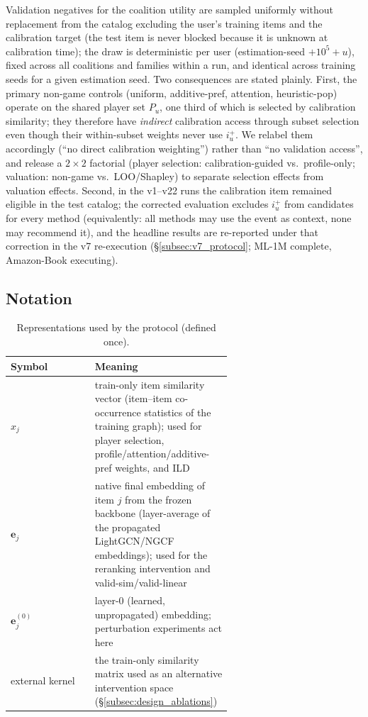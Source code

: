 \documentclass[pdflatex,sn-mathphys-num]{sn-jnl}
\begin{document}
Validation negatives for the coalition utility are sampled uniformly without replacement from the catalog excluding the user's training items and the calibration target (the test item is never blocked because it is unknown at calibration time); the draw is deterministic per user (estimation-seed $+10^{5}+u$), fixed across all coalitions and families within a run, and identical across training seeds for a given estimation seed. Two consequences are stated plainly. First, the primary non-game controls (uniform, additive-pref, attention, heuristic-pop) operate on the shared player set $P_u$, one third of which is selected by calibration similarity; they therefore have \emph{indirect} calibration access through subset selection even though their within-subset weights never use $i_u^+$. We relabel them accordingly (``no direct calibration weighting'') rather than ``no validation access'', and release a $2\times2$ factorial (player selection: calibration-guided vs.\ profile-only; valuation: non-game vs.\ LOO/Shapley) to separate selection effects from valuation effects. Second, in the v1--v22 runs the calibration item remained eligible in the test catalog; the corrected evaluation excludes $i_u^+$ from candidates for every method (equivalently: all methods may use the event as context, none may recommend it), and the headline results are re-reported under that correction in the v7 re-execution (\S\ref{subsec:v7_protocol}; ML-1M complete, Amazon-Book executing).

\subsection{Notation}\label{subsec:notation}

\begin{table}[t]
\caption{Representations used by the protocol (defined once).}\label{tab:notation}
\centering
\small
\begin{tabular}{lp{0.62\linewidth}}
\toprule
Symbol & Meaning \\
\midrule
$x_j$ & train-only item similarity vector (item--item co-occurrence statistics of the training graph); used for player selection, profile/attention/additive-pref weights, and ILD \\
$\mathbf{e}_j$ & native final embedding of item $j$ from the frozen backbone (layer-average of the propagated LightGCN/NGCF embeddings); used for the reranking intervention and valid-sim/valid-linear \\
$\mathbf{e}^{(0)}_j$ & layer-0 (learned, unpropagated) embedding; perturbation experiments act here \\
external kernel & the train-only similarity matrix used as an alternative intervention space (\S\ref{subsec:design_ablations}) \\
\bottomrule
\end{tabular}
\end{table}
\end{document}
